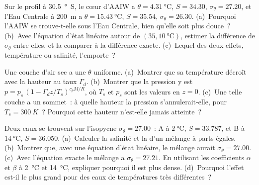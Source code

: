 \begin{exercise}[$\star\star$]\label{exo:b1:fluid-envelopes-structure:9}
Sur le profil à \qty{30.5}{\degree S}, le cœur d'AAIW a $\theta =
\qty{4.31}{\celsius}$, $S = 34.30$, $\sigma_\theta = 27.20$, et l'Eau Centrale
à \qty{200}{m} a $\theta = \qty{15.43}{\celsius}$, $S = 35.54$,
$\sigma_\theta = 26.30$. (a)~Pourquoi l'AAIW se trouve-t-elle sous l'Eau Centrale,
bien qu'elle soit plus douce~? (b)~Avec l'équation d'état linéaire autour de
$(35, \qty{10}{\celsius})$, estimer la différence de $\sigma_\theta$ entre
elles, et la comparer à la différence exacte. (c)~Lequel des deux effets,
température ou salinité, l'emporte~?
\end{exercise}

\begin{exercise}[$\star\star\star$]\label{exo:b1:fluid-envelopes-structure:10}
Une couche d'air sec a une  $\theta$ uniforme. (a)~Montrer que sa
température décroît avec la hauteur au taux $\Gamma_d$. (b)~Montrer que la
pression y est $p = p_s\,(1 - \Gamma_d z/T_s)^{c_pM/R}$, où $T_s$ et $p_s$ sont
les valeurs en $z = 0$. (c)~Une telle couche a un sommet~: à quelle hauteur la
pression s'annulerait-elle, pour $T_s = \qty{300}{K}$~? Pourquoi cette hauteur n'est-elle jamais atteinte~?
\end{exercise}

\begin{exercise}[$\star\star\star$]\label{exo:b1:fluid-envelopes-structure:11}
Deux eaux se trouvent sur l'isopycne $\sigma_\theta = 27.00$~: A à
$\qty{2}{\celsius}$, $S = 33.787$, et B à $\qty{14}{\celsius}$, $S = 36.050$.
(a)~Calculer la salinité et la  d'un mélange à parts égales.
(b)~Montrer que, avec une équation d'état linéaire, le mélange aurait
$\sigma_\theta = 27.00$. (c)~Avec l'équation exacte le mélange a
$\sigma_\theta = 27.21$. En utilisant les coefficients $\alpha$ et $\beta$ à \qty{2}{\celsius}
et \qty{14}{\celsius}, expliquer pourquoi il est plus dense. (d)~Pourquoi l'effet est-il le plus grand
pour des eaux de températures très différentes~?
\end{exercise}


